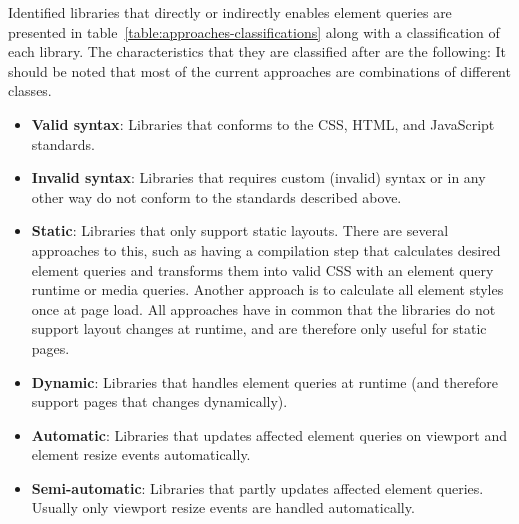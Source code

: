 \documentclass[a4paper,11pt]{kth-mag}
\begin{document}
    Identified libraries that directly or indirectly enables element queries are presented in table~\ref{table:approaches-classifications} along with a classification of each library.
    The characteristics that they are classified after are the following:
    It should be noted that most of the current approaches are combinations of different classes.
    \begin{itemize}
      \item \textbf{Valid syntax}: Libraries that conforms to the \gls{CSS}, \gls{HTML}, and \gls{JavaScript} standards.
      \item \textbf{Invalid syntax}: Libraries that requires custom (invalid) syntax or in any other way do not conform to the standards described above.
      \item \textbf{Static}:  Libraries that only support static layouts. 
                              There are several approaches to this, such as having a compilation step that calculates desired element queries and transforms them into valid \gls{CSS} with an element query runtime or \gls{media queries}. 
                              Another approach is to calculate all element styles once at page load. All approaches have in common that the libraries do not support layout changes at runtime, and are therefore only useful for static pages.
      \item \textbf{Dynamic}: Libraries that handles element queries at runtime (and therefore support pages that changes dynamically).
      \item \textbf{Automatic}: Libraries that updates affected element queries on \gls{viewport} and element resize events automatically.
      \item \textbf{Semi-automatic}: Libraries that partly updates affected element queries. Usually only \gls{viewport} resize events are handled automatically.
    \end{itemize}
    
\end{document}
